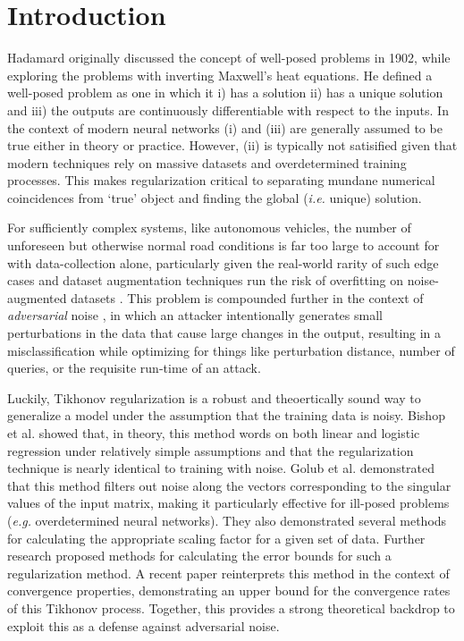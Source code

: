 \documentclass[conference]{IEEEtran}
\begin{document}
\section{Introduction}
Hadamard \cite{hadamard1902problemes} originally discussed the concept of well-posed problems in 1902, while exploring the problems with inverting Maxwell's heat equations. He defined a well-posed problem as one in which it i) has a solution ii) has a unique solution and iii) the outputs are continuously differentiable with respect to the inputs. In the context of modern neural networks (i) and (iii) are generally assumed to be true either in theory or practice. However, (ii) is typically not satisified given that modern techniques rely on massive datasets and overdetermined training processes. This makes regularization critical to separating mundane numerical coincidences from `true' object and finding the global  (\textit{i.e.} unique) solution.

For sufficiently complex systems, like autonomous vehicles, the number of unforeseen but otherwise normal road conditions is far too large to account for with data-collection alone, particularly given the real-world rarity of such edge cases and dataset augmentation techniques run the risk of overfitting on noise-augmented datasets \cite{koopman2016challenges}. This problem is compounded further in the context of \textit{adversarial} noise \cite{adversarialpatch, madry2017towards, chakraborty2018adversarial, biggio_evasion_2013, biggio_poisoning_2013, croce_reliable_2020, dohmatob_generalized_2019, fredrikson_model_2015, hopskipjump, kotyan2022adversarial}, in which an attacker intentionally generates small perturbations in the data that cause large changes in the output, resulting in a misclassification while optimizing for things like perturbation distance, number of queries, or the requisite run-time of an attack. 

Luckily, Tikhonov regularization is a robust and theoertically sound way to generalize a model under the assumption that the training data is noisy. Bishop et al. \cite{bishop1995training} showed that, in theory, this method words on both linear and logistic regression under relatively simple assumptions and that the regularization technique is nearly identical to training with noise. Golub et al. \cite{golub1999tikhonov} demonstrated that this method filters out noise along the vectors corresponding to the singular values of the input matrix, making it particularly effective for ill-posed problems (\textit{e.g.} overdetermined neural networks). They also demonstrated several methods for calculating the appropriate scaling factor for a given set of data. Further research \cite{zhao2011modified} proposed methods for calculating the error bounds for such a regularization method. A recent paper \cite{gerth2021new} reinterprets this method in the context of convergence properties, demonstrating an upper bound for the convergence rates of this Tikhonov process. Together, this provides a strong theoretical backdrop to exploit this as a defense against adversarial noise. 
\end{document}
